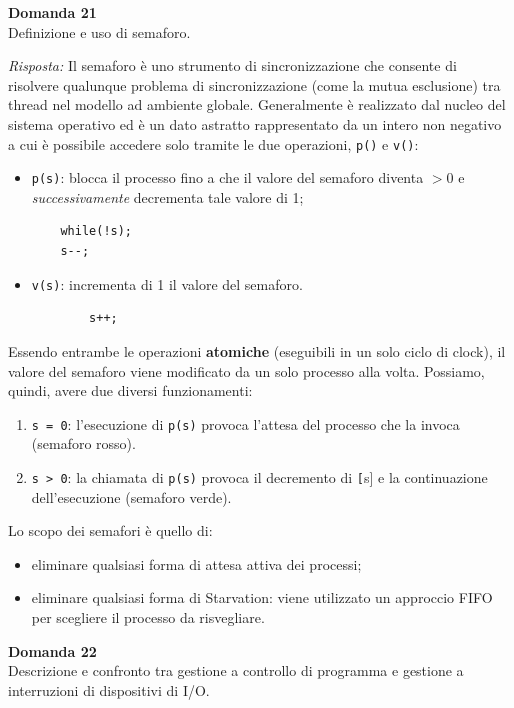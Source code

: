 \documentclass{article}
\newenvironment{problem}[2][Domanda]
    { \begin{mdframed}[backgroundcolor=gray!20] \textbf{#1 #2} \\}
    {  \end{mdframed}}
\newenvironment{solution}
    {\textit{Risposta:}}
    {}
\begin{document}
\begin{problem}{21}
Definizione e uso di semaforo.
\end{problem}
\begin{solution}
Il semaforo è uno strumento di sincronizzazione che consente di risolvere qualunque problema di sincronizzazione (come la mutua esclusione) tra thread nel modello ad ambiente globale.
\newline
Generalmente è realizzato dal nucleo del sistema operativo ed è un dato astratto rappresentato da un intero non negativo a cui è possibile accedere solo tramite le due operazioni, \texttt{p()} e \texttt{v()}:
\begin{itemize}
    \item \texttt{p(s)}: blocca il processo fino a che il valore del semaforo diventa $> 0$ e \textit{successivamente} decrementa tale valore di 1;
\begin{verbatim}
    while(!s);
    s--;
\end{verbatim}
\item \texttt{v(s)}: incrementa di 1 il valore del semaforo.  
    \begin{verbatim}
        s++;
    \end{verbatim}
\end{itemize}
Essendo entrambe le operazioni \textbf{atomiche} (eseguibili in un solo ciclo di clock), il valore del semaforo viene modificato da un solo processo alla volta.
Possiamo, quindi, avere due diversi funzionamenti:  
\begin{enumerate}
    \item \texttt{s = 0}: l’esecuzione di \texttt{p(s)} provoca l’attesa del processo che la invoca (semaforo rosso).
    \item \texttt{s > 0}: la chiamata di \texttt{p(s)} provoca il decremento di \texttt[s] e la continuazione dell’esecuzione (semaforo verde).
\end{enumerate}
Lo scopo dei semafori è quello di:
\begin{itemize}
    \item eliminare qualsiasi forma di attesa attiva dei processi;
    \item eliminare qualsiasi forma di Starvation: viene utilizzato un approccio FIFO per scegliere il processo da risvegliare.
\end{itemize}
\end{solution}
\begin{problem}{22}
Descrizione e confronto tra gestione a controllo di programma e gestione a interruzioni di dispositivi di I/O.
\end{problem}
\end{document}
